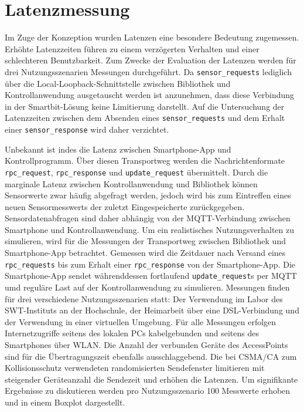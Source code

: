 \documentclass[11pt,a4paper]{report}
\begin{document}
\section{Latenzmessung}
Im Zuge der Konzeption wurden Latenzen eine besondere Bedeutung zugemessen.
Erhöhte Latenzzeiten führen zu einem verzögerten Verhalten und einer schlechteren Benutzbarkeit.
Zum Zwecke der Evaluation der Latenzen werden für drei Nutzungsszenarien Messungen durchgeführt.
Da \texttt{sensor\_requests} lediglich über die Local-Loopback-Schnittstelle zwischen Bibliothek und Kontrollanwendung ausgetauscht werden ist anzunehmen, dass diese Verbindung in der Smartbit-Lösung keine Limitierung darstellt.
Auf die Untersuchung der Latenzzeiten zwischen dem Absenden eines \texttt{sensor\_requests} und dem Erhalt einer \texttt{sensor\_response} wird daher verzichtet.

Unbekannt ist indes die Latenz zwischen Smartphone-App und Kontrollprogramm.
Über diesen Transportweg werden die Nachrichtenformate \texttt{rpc\_request}, \texttt{rpc\_response} und \texttt{update\_request} übermittelt.
Durch die marginale Latenz zwischen Kontrollanwendung und Bibliothek können Sensorwerte zwar häufig abgefragt werden, jedoch wird bis zum Eintreffen eines neuen Sensormesswerts der zuletzt Eingespeicherte zurückgegeben.
Sensordatenabfragen sind daher abhängig von der MQTT-Verbindung zwischen Smartphone und Kontrollanwendung.
Um ein realistisches Nutzungsverhalten zu simulieren, wird für die Messungen der Transportweg zwischen Bibliothek und Smartphone-App betrachtet.
Gemessen wird die Zeitdauer nach Versand eines \texttt{rpc\_requests} bis zum Erhalt einer \texttt{rpc\_response} von der Smartphone-App.
Die Smartphone-App sendet währenddessen fortlaufend \texttt{update\_request}s per MQTT umd reguläre Last auf der Kontrollanwendung zu simulieren.
Messungen finden für drei verschiedene Nutzungsszenarien statt: Der Verwendung im Labor des SWT-Instituts an der Hochschule, der Heimarbeit über eine DSL-Verbindung und der Verwendung in einer virtuellen Umgebung.
Für alle Messungen erfolgen Internetzugriffe seitens des lokalen PCs kabelgebunden und seitens des Smartphones über WLAN.
Die Anzahl der verbunden Geräte des AccessPoints sind für die Übertragungszeit ebenfalls ausschlaggebend.
Die bei CSMA/CA zum Kollisionsschutz verwendeten randomisierten Sendefenster limitieren mit steigender Geräteanzahl die Sendezeit und erhöhen die Latenzen.
Um signifikante Ergebnisse zu diskutieren werden pro Nutzungsszenario 100 Messwerte erhoben und in einem Boxplot dargestellt.
\end{document}
